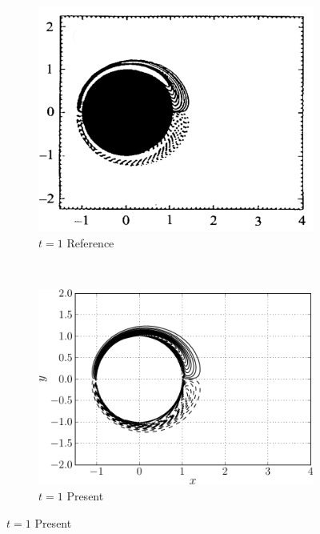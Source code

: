 	\begin{figure}[p]
     \centering
     \begin{subfigure}[t]{0.45\textwidth}
             \includegraphics[height=0.2\textheight]{figures/eulerian/ISC_vorticityContours_t1_ref-mod.png}
             \caption{$t=1$ Reference}
             \label{fig:ISC_vorticityContours_t1_ref}
     \end{subfigure}%
     ~ %
     \begin{subfigure}[t]{0.45\textwidth}
             \includegraphics[height=0.2\textheight]{figures/eulerian/ISC_vorticityContours_t1_fliped-crop.pdf}
             \caption{$t=1$ Present}
             \label{fig:ISC_vorticityContours_t1-crop}
     \end{subfigure}
     

\end{figure}
